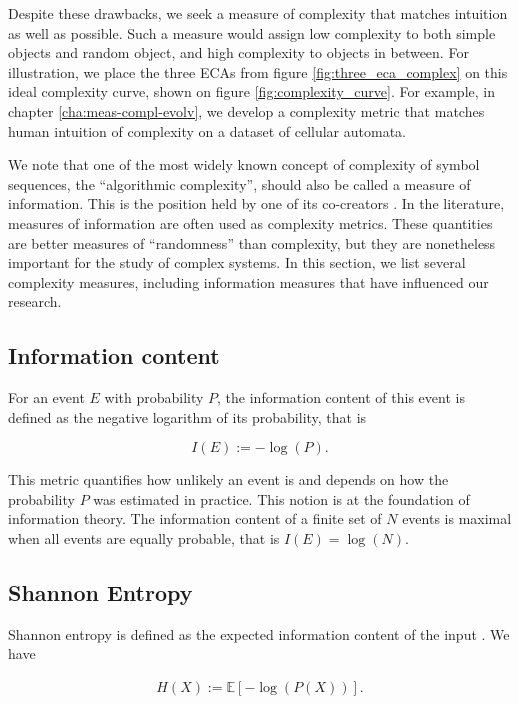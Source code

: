 Despite these drawbacks, we seek a measure of complexity that matches intuition
as well as possible. Such a measure would assign low complexity to both simple
objects and random object, and high complexity to objects in between. For
illustration, we place the three \acp{ECA} from figure
\ref{fig:three_eca_complex} on this ideal complexity curve, shown on figure
\ref{fig:complexity_curve}. For example, in chapter \ref{cha:meas-compl-evolv},
we develop a complexity metric that matches human intuition of complexity on a
dataset of cellular automata.

We note that one of the most widely known concept of complexity of symbol
sequences, the ``algorithmic complexity'', should also be called a measure of
information. This is the position held by one of its co-creators
\parencite{chaitinInformationRandomnessIncompleteness1990}. In the literature,
measures of information are often used as complexity metrics. These quantities
are better measures of ``randomness'' than complexity, but they are nonetheless
important for the study of complex systems. In this section, we list several
complexity measures, including information measures that have influenced our
research.

\subsection{Information content}
For an event $E$ with probability $P$, the information content of this event is
defined as the negative logarithm of its probability, that is

\begin{equation}
  I(E) :=  -\log(P).
\end{equation}

This metric quantifies how unlikely an event is and depends on how the
probability $P$ was estimated in practice. This notion is at the foundation of
information theory. The information content of a finite set of $N$ events is maximal 
when all events are equally probable, that is $I(E) = \log(N)$.

\subsection{Shannon Entropy}
Shannon entropy is defined as the expected information content of the input
\parencite{shannonMathematicalTheoryCommunication1975}. We have

\begin{align*}
  H(X) := \mathbb{E}[-\log(P(X))].
\end{align*}

